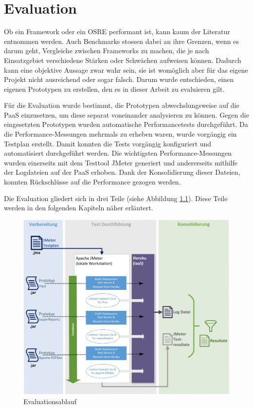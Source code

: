 \documentclass[main.tex]{subfiles}
\begin{document}
\chapter{Evaluation}

Ob ein Framework oder ein OSRE performant ist, kann kaum der Literatur entnommen werden. Auch Benchmarks stossen dabei an ihre Grenzen, wenn es darum geht, Vergleiche zwischen Frameworks zu machen, die je nach Einsatzgebiet verschiedene Stärken oder Schwächen aufweisen können. Dadurch kann eine objektive Aussage zwar wahr sein, sie ist womöglich aber für das eigene Projekt nicht ausreichend oder sogar falsch. Darum wurde entschieden, einen eigenen Prototypen zu erstellen, den es in dieser Arbeit zu evaluieren gilt. 

Für die Evaluation wurde bestimmt, die Prototypen abwechslungsweise auf die PaaS einzusetzen, um diese separat voneinander analysieren zu können. Gegen die eingesetzten Prototypen wurden automatische Performancetests durchgeführt. Da die Performance-Messungen mehrmals zu erheben waren, wurde vorgängig ein Testplan erstellt. Damit konnten die Tests vorgängig konfiguriert und automatisiert durchgeführt werden. Die wichtigsten Performance-Messungen wurden einerseits mit dem Testtool JMeter generiert und andererseits mithilfe der Logdateien auf der PaaS erhoben. Dank der Konsolidierung dieser Dateien, konnten Rückschlüsse auf die Performance gezogen werden.

Die Evaluation gliedert sich in drei Teile (siehe Abbildung \ref{figure:evaluationsAblauf}). Diese Teile werden in den folgenden Kapiteln näher erläutert.

\begin{figure}[h]
\includegraphics[width=\textwidth]{mainpart/3_methodik_evaluation_img/Testablauf.png}
 \caption{Evaluationsablauf}
 \label{figure:evaluationsAblauf}
\end{figure}
\end{document}
